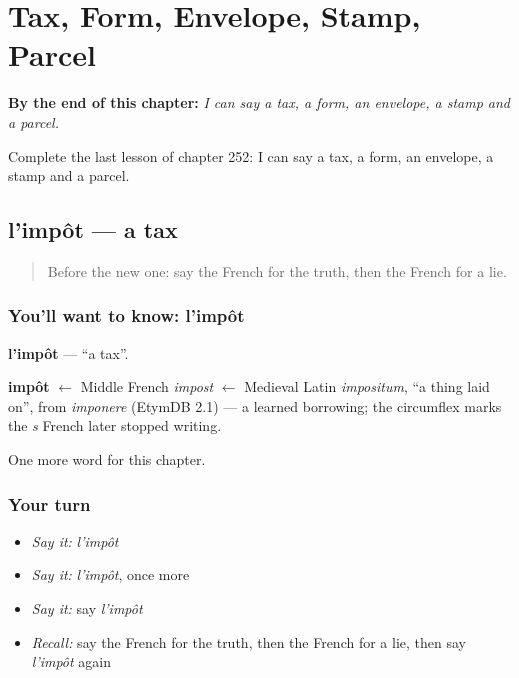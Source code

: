 
\chapter{Tax, Form, Envelope, Stamp, Parcel}
\label{ch:fr-tax-form-envelope-stamp-parcel}

\begin{chapteropening}
\textbf{By the end of this chapter:} \emph{I can say a tax, a form, an envelope, a stamp and a parcel.}

Complete the last lesson of chapter 252: I can say a tax, a form, an envelope, a stamp and a parcel.
\end{chapteropening}

\section[l'impôt]{l'impôt — a tax}

\label{lesson:FR-C252-impot}



\begin{quote}
Before the new one: say the French for the truth, then the French for a lie.
\end{quote}

\subsection*{You'll want to know: l'impôt}
\textbf{l'impôt} — \textquotedblleft{}a tax\textquotedblright{}.

\begin{cousinweb}
\textbf{impôt} $\leftarrow$ Middle French \emph{impost} $\leftarrow$ Medieval Latin \emph{impositum}, \textquotedblleft{}a thing laid on\textquotedblright{}, from \emph{imponere} (EtymDB 2.1) — a learned borrowing; the circumflex marks the \emph{s} French later stopped writing.
\end{cousinweb}

\begin{grammarlens}[title={What you've built}]
One more word for this chapter.
\end{grammarlens}

\subsection*{Your turn}
\begin{itemize}
\raggedright
  \item \emph{Say it:} \emph{l'impôt}
  \item \emph{Say it:} \emph{l'impôt}, once more
  \item \emph{Say it:} say \emph{l'impôt}
  \item \emph{Recall:} say the French for the truth, then the French for a lie, then say \emph{l'impôt} again
\end{itemize}

